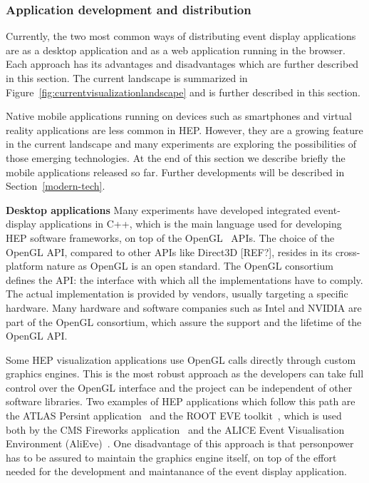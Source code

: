 \documentclass[12pt,a4paper]{article}
\begin{document}

\hypertarget{application-development}{%
\subsubsection{Application development and distribution}\label{application-development}}

Currently, the two most common ways of distributing event display applications are as a desktop application and as a web
application running in the browser. Each approach has its advantages and disadvantages which are further described in this section.
The current landscape is summarized in Figure~\ref{fig:currentvisualizationlandscape} and is further described in this section.

Native mobile applications running on devices such as smartphones and virtual reality applications are less common in HEP.
However, they are a growing feature in the current landscape and many experiments are exploring the
possibilities of those emerging technologies. At the end of this section we describe briefly the mobile applications released so far.
Further developments will be described in
Section~\ref{modern-tech}.

{\bf Desktop applications} Many experiments have developed integrated event-display applications in C++, which is the main language
used for developing HEP software frameworks, on top of the OpenGL~\cite{OpenGL1992} APIs.
The choice of the OpenGL API, compared to other APIs like Direct3D [REF?], resides in its cross-platform nature as
OpenGL is an open standard. The OpenGL consortium defines the API: the interface with which all the implementations have to
comply. The actual implementation is provided by vendors, usually targeting a specific hardware. Many hardware and
software companies such as Intel and NVIDIA are part of the OpenGL consortium, which assure
the support and the lifetime of the OpenGL API.

Some HEP visualization applications use OpenGL calls directly through custom graphics engines. This is the most
robust approach as the developers can take full control over the OpenGL interface
and the project can be independent of other software libraries. Two examples of HEP applications which follow this path are the
ATLAS Persint application~\cite{ATLASPersint2012} and the ROOT EVE toolkit~\cite{ROOTEVE2007}, which is used both by the CMS
Fireworks application~\cite{CMSFireworks} and the ALICE Event Visualisation Environment (AliEve)~\cite{alieve}.
One disadvantage of this approach is that personpower has to be assured to maintain the graphics engine itself,
on top of the effort needed for the development and maintanance of the event display application.
\end{document}
